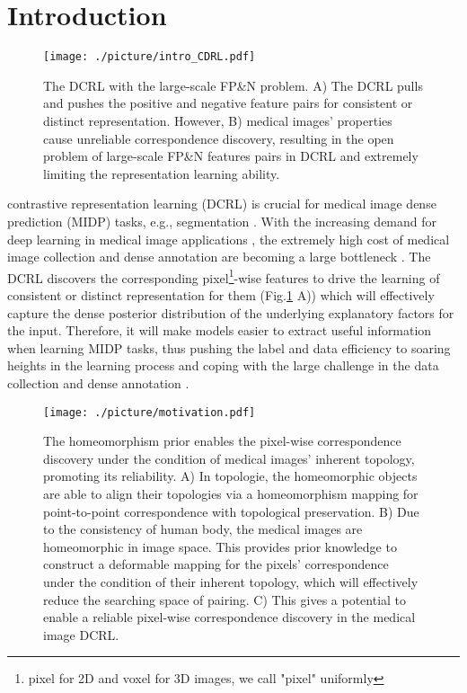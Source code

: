 \section{Introduction}
\label{sec:intro}
\begin{figure}
  \centering
  \texttt{[image: ./picture/intro\_CDRL.pdf]}
  \caption{The DCRL with the large-scale FP\&N problem. A) The DCRL pulls and pushes the positive and negative feature pairs for consistent or distinct representation. However, B) medical images' properties cause unreliable correspondence discovery, resulting in the open problem of large-scale FP\&N features pairs in DCRL and extremely limiting the representation learning ability.}\label{intro:dcrl}
\end{figure}
 contrastive representation learning (DCRL) \cite{li2021dense,o2020unsupervised,wang2022densecl,wang2022exploring,xie2021propagate,bengio2013representation,you2022simcvd} is crucial for medical image dense prediction (MIDP) tasks, e.g., segmentation \cite{he2022learning,he2021meta,you2022class}. With the increasing demand for deep learning in medical image applications \cite{piccialli2021survey}, the extremely high cost of medical image collection and dense annotation are becoming a large bottleneck \cite{cheplygina2019not}. The DCRL discovers the corresponding pixel\footnote{pixel for 2D and voxel for 3D images, we call "pixel" uniformly}-wise features \cite{milbich2021visual,zhang2022attributable,roth2020pads,you2022momentum} to drive the learning of consistent or distinct representation for them (Fig.\ref{intro:dcrl} A)) which will effectively capture the dense posterior distribution of the underlying explanatory factors for the input. Therefore, it will make models easier to extract useful information \cite{bengio2013representation} when learning MIDP tasks, thus pushing the label and data efficiency to soaring heights in the learning process and coping with the large challenge in the data collection and dense annotation \cite{litjens2017survey}.
\begin{figure}
  \centering
  \texttt{[image: ./picture/motivation.pdf]}
  \caption{The homeomorphism prior enables the pixel-wise correspondence discovery under the condition of medical images' inherent topology, promoting its reliability. A) In topologie, the homeomorphic objects are able to align their topologies via a homeomorphism mapping for point-to-point correspondence with topological preservation. B) Due to the consistency of human body, the medical images are homeomorphic in image space. This provides prior knowledge to construct a deformable mapping for the pixels' correspondence under the condition of their inherent topology, which will effectively reduce the searching space of pairing. C) This gives a potential to enable a reliable pixel-wise correspondence discovery in the medical image DCRL.}\label{intro:1}
\end{figure}


